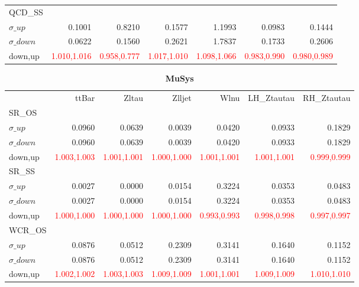 \documentclass[11pt,oneside,a4paper]{article}
\begin{document}
\begin{table}
\begin{tabular}{lrrrrrr}
\hline
QCD\_SS &  &  &  &  &  &  \\
$\sigma\_up$ & 0.1001 & 0.8210 & 0.1577 & 1.1993 & 0.0983 & 0.1444 \\
$\sigma\_down$ & 0.0622 & 0.1560 & 0.2621 & 1.7837 & 0.1733 & 0.2606 \\
down,up & \textcolor{red}{1.010,1.016} & \textcolor{red}{0.958,0.777} & \textcolor{red}{1.017,1.010} & \textcolor{red}{1.098,1.066} & \textcolor{red}{0.983,0.990} & \textcolor{red}{0.980,0.989} \\

\hline
\end{tabular}
\end{table}
\begin{table}
\centering
\caption{\bf{MuSys}}
\begin{tabular}{lrrrrrr}
 & ttBar & Zltau & Zlljet & Wlnu & LH\_Ztautau & RH\_Ztautau \\
SR\_OS &  &  &  &  &  &  \\
$\sigma\_up$ & 0.0960 & 0.0639 & 0.0039 & 0.0420 & 0.0933 & 0.1829 \\
$\sigma\_down$ & 0.0960 & 0.0639 & 0.0039 & 0.0420 & 0.0933 & 0.1829 \\
down,up & \textcolor{red}{1.003,1.003} & \textcolor{red}{1.001,1.001} & \textcolor{red}{1.000,1.000} & \textcolor{red}{1.001,1.001} & \textcolor{red}{1.001,1.001} & \textcolor{red}{0.999,0.999} \\

\hline
SR\_SS &  &  &  &  &  &  \\
$\sigma\_up$ & 0.0027 & 0.0000 & 0.0154 & 0.3224 & 0.0353 & 0.0483 \\
$\sigma\_down$ & 0.0027 & 0.0000 & 0.0154 & 0.3224 & 0.0353 & 0.0483 \\
down,up & \textcolor{red}{1.000,1.000} & \textcolor{red}{1.000,1.000} & \textcolor{red}{1.000,1.000} & \textcolor{red}{0.993,0.993} & \textcolor{red}{0.998,0.998} & \textcolor{red}{0.997,0.997} \\

\hline
WCR\_OS &  &  &  &  &  &  \\
$\sigma\_up$ & 0.0876 & 0.0512 & 0.2309 & 0.3141 & 0.1640 & 0.1152 \\
$\sigma\_down$ & 0.0876 & 0.0512 & 0.2309 & 0.3141 & 0.1640 & 0.1152 \\
down,up & \textcolor{red}{1.002,1.002} & \textcolor{red}{1.003,1.003} & \textcolor{red}{1.009,1.009} & \textcolor{red}{1.001,1.001} & \textcolor{red}{1.009,1.009} & \textcolor{red}{1.010,1.010} \\


\end{tabular}
\end{table}
\end{document}
